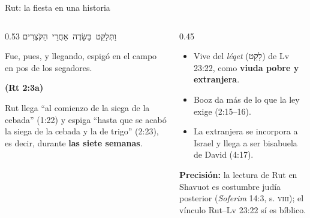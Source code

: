 \documentclass[hyperref={bookmarks=false},aspectratio=169]{beamer}
\newcommand{\heb}[1]{\mbox{\foreignlanguage{hebrew}{#1}}}
\newcommand{\fuente}[1]{\par\hfill{\upshape\bfseries\footnotesize\textcolor{tierraroja}{#1}}}
\newcommand{\destacar}[1]{\textbf{\textcolor{tierraroja}{#1}}}
\newcommand{\precision}[1]{{\footnotesize\color{sepia}\textbf{Precisión:} #1}}
\begin{document}
\begin{frame}{Rut: la fiesta en una historia}
\begin{columns}[c,onlytextwidth]
\begin{column}{0.53\textwidth}
\centering\heb{וַתְּלַקֵּט בַּשָּׂדֶה אַחֲרֵי הַקֹּצְרִים}
\begin{cita}Fue, pues, y llegando, espigó en el campo en pos de los segadores.\fuente{(Rt 2:3a)}\end{cita}
\small\RaggedRight Rut llega ``al comienzo de la siega de la cebada'' (1:22) y espiga ``hasta que se acabó la siega de la cebada y la de trigo'' (2:23), es decir, durante \destacar{las siete semanas}.
\end{column}
\begin{column}{0.45\textwidth}\small
\begin{itemize}
\item Vive del \emph{léqet} (\heb{לָקַט}) de Lv 23:22, como \destacar{viuda pobre y extranjera}.
\item Booz da más de lo que la ley exige (2:15--16).
\item La extranjera se incorpora a Israel y llega a ser bisabuela de David (4:17).
\end{itemize}\smallskip
\precision{la lectura de Rut en Shavuot es costumbre judía posterior (\emph{Soferim} 14:3, s. \textsc{viii}); el vínculo Rut--Lv 23:22 sí es bíblico.}
\end{column}
\end{columns}
\end{frame}
\end{document}

